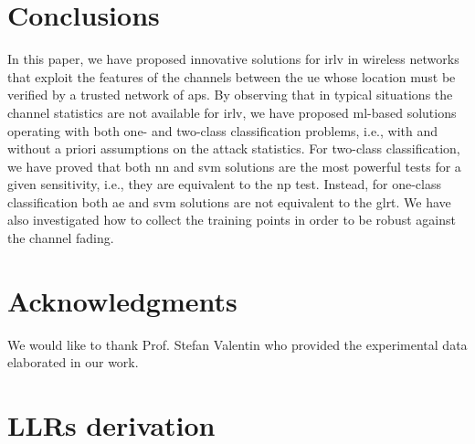 \documentclass[draftcls,journal,onecolumn]{IEEEtran}
\begin{document}

\section{Conclusions}

In this paper, we have proposed innovative solutions for \ac{irlv} in wireless networks that exploit the features of the channels between the \ac{ue} whose location must be verified by a trusted network of \acp{ap}. By observing that in typical situations the channel statistics are not available for \ac{irlv}, we have proposed \ac{ml}-based solutions operating with both one- and two-class classification problems, i.e., with and without a priori assumptions on the attack statistics. For two-class classification, we have proved that  both \ac{nn} and \ac{svm} solutions  are the most powerful tests for a given sensitivity, i.e., they are equivalent to the \ac{np} test. Instead, for one-class classification both \ac{ae} and \ac{svm} solutions are not equivalent to the \ac{glrt}. We have also investigated how to collect the training points in order to be robust against the channel fading.

\section*{Acknowledgments}

We would like to thank Prof. Stefan Valentin who provided the experimental data elaborated in our work.

\appendices

\section{LLRs derivation}
\label{sec:llrDer}
\end{document}
